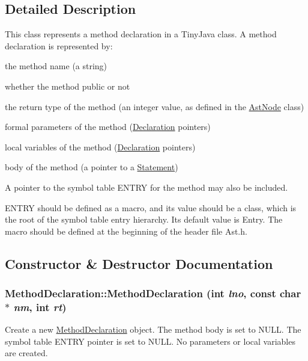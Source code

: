 \subsection{Detailed Description}
This class represents a method declaration in a TinyJava class. A method declaration is represented by:
\begin{DoxyItemize}
\item the method name (a string)
\item whether the method public or not
\item the return type of the method (an integer value, as defined in the \hyperlink{classAstNode}{AstNode} class)
\item formal parameters of the method (\hyperlink{classDeclaration}{Declaration} pointers)
\item local variables of the method (\hyperlink{classDeclaration}{Declaration} pointers)
\item body of the method (a pointer to a \hyperlink{classStatement}{Statement})
\end{DoxyItemize}

A pointer to the symbol table ENTRY for the method may also be included.

ENTRY should be defined as a macro, and its value should be a class, which is the root of the symbol table entry hierarchy. Its default value is Entry. The macro should be defined at the beginning of the header file Ast.h. 

\subsection{Constructor \& Destructor Documentation}
\hypertarget{classMethodDeclaration_ae1ac6dc291290fc20f067360e275d3bb}{
\subsubsection[{MethodDeclaration}]{\setlength{\rightskip}{0pt plus 5cm}MethodDeclaration::MethodDeclaration (int {\em lno}, \/  const char $\ast$ {\em nm}, \/  int {\em rt})}}
\label{classMethodDeclaration_ae1ac6dc291290fc20f067360e275d3bb}
Create a new \hyperlink{classMethodDeclaration}{MethodDeclaration} object. The method body is set to NULL. The symbol table ENTRY pointer is set to NULL. No parameters or local variables are created.


